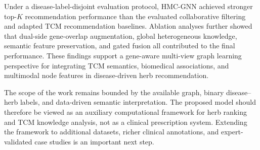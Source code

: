 \documentclass[journal,twoside,web]{ieeecolor}
\begin{document}
Under a disease-label-disjoint evaluation protocol, HMC-GNN achieved stronger top-$K$ recommendation performance than the evaluated collaborative filtering and adapted TCM recommendation baselines. Ablation analyses further showed that dual-side gene-overlap augmentation, global heterogeneous knowledge, semantic feature preservation, and gated fusion all contributed to the final performance. These findings support a gene-aware multi-view graph learning perspective for integrating TCM semantics, biomedical associations, and multimodal node features in disease-driven herb recommendation.

The scope of the work remains bounded by the available graph, binary disease--herb labels, and data-driven semantic interpretation. The proposed model should therefore be viewed as an auxiliary computational framework for herb ranking and TCM knowledge analysis, not as a clinical prescription system. Extending the framework to additional datasets, richer clinical annotations, and expert-validated case studies is an important next step.
\end{document}
